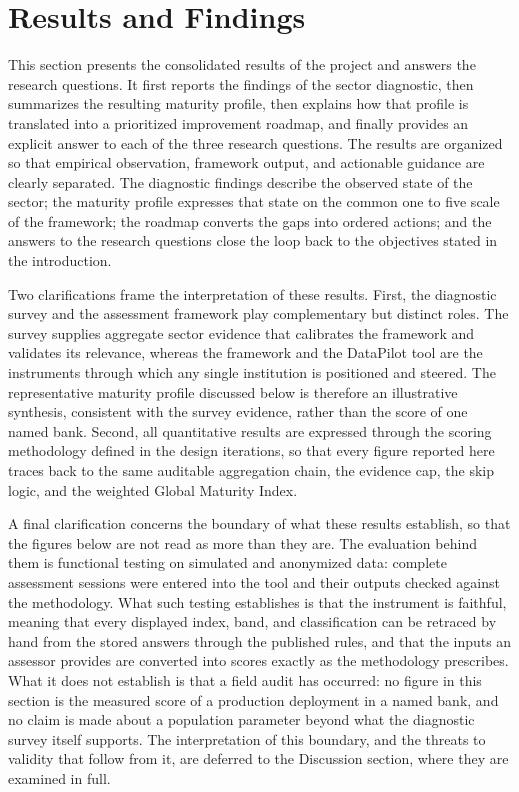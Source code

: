 
\section{Results and Findings}

This section presents the consolidated results of the project and answers the research questions. It first reports the findings of the sector diagnostic, then summarizes the resulting maturity profile, then explains how that profile is translated into a prioritized improvement roadmap, and finally provides an explicit answer to each of the three research questions. The results are organized so that empirical observation, framework output, and actionable guidance are clearly separated. The diagnostic findings describe the observed state of the sector; the maturity profile expresses that state on the common one to five scale of the framework; the roadmap converts the gaps into ordered actions; and the answers to the research questions close the loop back to the objectives stated in the introduction.

Two clarifications frame the interpretation of these results. First, the diagnostic survey and the assessment framework play complementary but distinct roles. The survey supplies aggregate sector evidence that calibrates the framework and validates its relevance, whereas the framework and the DataPilot tool are the instruments through which any single institution is positioned and steered. The representative maturity profile discussed below is therefore an illustrative synthesis, consistent with the survey evidence, rather than the score of one named bank. Second, all quantitative results are expressed through the scoring methodology defined in the design iterations, so that every figure reported here traces back to the same auditable aggregation chain, the evidence cap, the skip logic, and the weighted Global Maturity Index.

A final clarification concerns the boundary of what these results establish, so that the figures below are not read as more than they are. The evaluation behind them is functional testing on simulated and anonymized data: complete assessment sessions were entered into the tool and their outputs checked against the methodology. What such testing establishes is that the instrument is faithful, meaning that every displayed index, band, and classification can be retraced by hand from the stored answers through the published rules, and that the inputs an assessor provides are converted into scores exactly as the methodology prescribes. What it does not establish is that a field audit has occurred: no figure in this section is the measured score of a production deployment in a named bank, and no claim is made about a population parameter beyond what the diagnostic survey itself supports. The interpretation of this boundary, and the threats to validity that follow from it, are deferred to the Discussion section, where they are examined in full.

